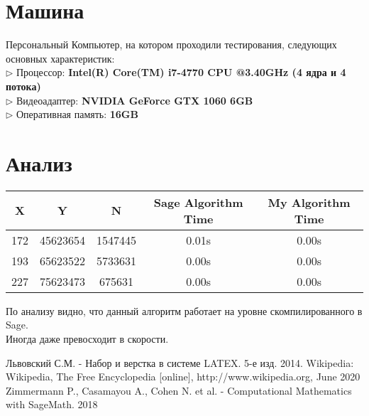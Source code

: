 \documentclass[11pt]{article}
\begin{document}
\section{Машина}
Персональный Компьютер, на котором проходили тестирования, следующих основных характеристик:
\\$\triangleright$ Процессор: \textbf{Intel(R) Core(TM) i7-4770 CPU @3.40GHz (4 ядра и 4 потока)}
\\$\triangleright$ Видеоадаптер: \textbf{NVIDIA GeForce GTX 1060 6GB}
\\$\triangleright$ Оперативная память: \textbf{16GB}

\section{Анализ}

\begin{tabular}{|c|c|c|c|c|}
\hline
X & Y & N & Sage Algorithm Time & My Algorithm Time\\
\hline
\hline
172 & 45623654 & 1547445 & 0.01s & 0.00s\\
193 & 65623522 & 5733631 & 0.00s & 0.00s\\
227 & 75623473 & 675631 & 0.00s & 0.00s\\
\hline
\end{tabular}

По анализу видно, что данный алгоритм работает на уровне скомпилированного в Sage. \\Иногда даже превосходит в скорости.

\begin{thebibliography}{3}

	 Львовский С.М. - Набор и верстка в системе LATEX. 5-е изд. 2014.
	 Wikipedia: Wikipedia, The Free Encyclopedia [online], http://www.wikipedia.org, June 2020
	 Zimmermann P., Casamayou A., Cohen N. et al. - Computational Mathematics with SageMath. 2018

\end{thebibliography}
\end{document}
